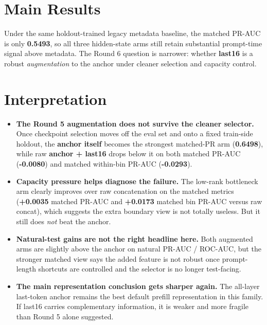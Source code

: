 \documentclass[11pt]{article}
\begin{document}
\section*{Main Results}
\begin{center}
\small
\setlength{\tabcolsep}{4pt}
\end{center}

Under the same holdout-trained legacy metadata baseline, the matched PR-AUC is only \textbf{0.5493}, so all three hidden-state arms still retain substantial prompt-time signal above metadata. The Round 6 question is narrower: whether \textbf{last16} is a robust \emph{augmentation} to the anchor under cleaner selection and capacity control.

\section*{Interpretation}
\begin{itemize}
  \item \textbf{The Round 5 augmentation does not survive the cleaner selector.} Once checkpoint selection moves off the eval set and onto a fixed train-side holdout, the \textbf{anchor itself} becomes the strongest matched-PR arm (\textbf{0.6498}), while raw \textbf{anchor + last16} drops below it on both matched PR-AUC (\textbf{-0.0080}) and matched within-bin PR-AUC (\textbf{-0.0293}).
  \item \textbf{Capacity pressure helps diagnose the failure.} The low-rank bottleneck arm clearly improves over raw concatenation on the matched metrics (\textbf{+0.0035} matched PR-AUC and \textbf{+0.0173} matched bin PR-AUC versus raw concat), which suggests the extra boundary view is not totally useless. But it still does \emph{not} beat the anchor.
  \item \textbf{Natural-test gains are not the right headline here.} Both augmented arms are slightly above the anchor on natural PR-AUC / ROC-AUC, but the stronger matched view says the added feature is not robust once prompt-length shortcuts are controlled and the selector is no longer test-facing.
  \item \textbf{The main representation conclusion gets sharper again.} The all-layer last-token anchor remains the best default prefill representation in this family. If last16 carries complementary information, it is weaker and more fragile than Round 5 alone suggested.
\end{itemize}
\end{document}

